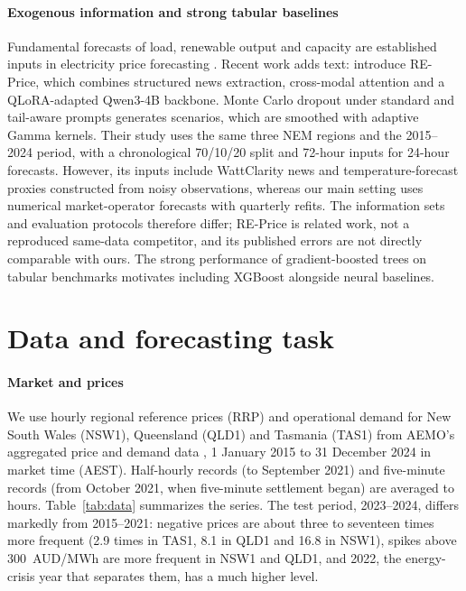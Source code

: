 \documentclass[preprint,12pt]{elsarticle}
\begin{document}
\paragraph{Exogenous information and strong tabular baselines} Fundamental forecasts of load, renewable output and capacity are established inputs in electricity price forecasting \citep{weron2014electricity,lago2021forecasting}. Recent work adds text: \citet{chen2026reprice} introduce RE-Price, which combines structured news extraction, cross-modal attention and a QLoRA-adapted Qwen3-4B backbone. Monte Carlo dropout under standard and tail-aware prompts generates scenarios, which are smoothed with adaptive Gamma kernels. Their study uses the same three NEM regions and the 2015--2024 period, with a chronological 70/10/20 split and 72-hour inputs for 24-hour forecasts. However, its inputs include WattClarity news and temperature-forecast proxies constructed from noisy observations, whereas our main setting uses numerical market-operator forecasts with quarterly refits. The information sets and evaluation protocols therefore differ; RE-Price is related work, not a reproduced same-data competitor, and its published errors are not directly comparable with ours. The strong performance of gradient-boosted trees on tabular benchmarks \citep{grinsztajn2022tree} motivates including XGBoost alongside neural baselines.

\section{Data and forecasting task}
\label{sec:data}

\paragraph{Market and prices} We use hourly regional reference prices (RRP) and operational demand for New South Wales (NSW1), Queensland (QLD1) and Tasmania (TAS1) from AEMO's aggregated price and demand data \citep{aemo2025priceanddemand}, 1 January 2015 to 31 December 2024 in market time (AEST). Half-hourly records (to September 2021) and five-minute records (from October 2021, when five-minute settlement began) are averaged to hours. Table~\ref{tab:data} summarizes the series. The test period, 2023--2024, differs markedly from 2015--2021: negative prices are about three to seventeen times more frequent (2.9 times in TAS1, 8.1 in QLD1 and 16.8 in NSW1), spikes above 300~AUD/MWh are more frequent in NSW1 and QLD1, and 2022, the energy-crisis year that separates them, has a much higher level.
\end{document}
